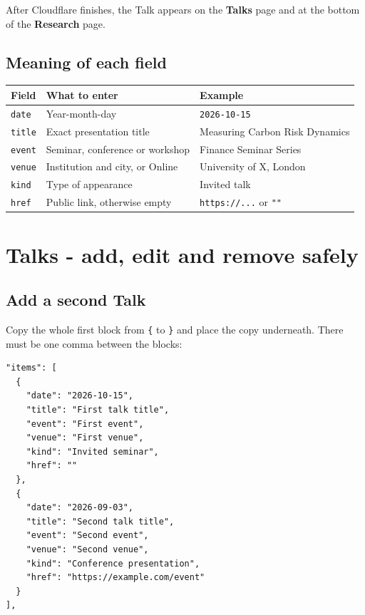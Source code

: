 \documentclass[10pt,a4paper]{article}
\begin{document}
\begin{tcolorbox}[teal]
After Cloudflare finishes, the Talk appears on the \textbf{Talks} page and at the bottom of the \textbf{Research} page.
\end{tcolorbox}

\subsection{Meaning of each field}

\begin{tabularx}{\linewidth}{L{25mm}Y L{43mm}}
\toprule
\textbf{Field} & \textbf{What to enter} & \textbf{Example}\\
\midrule
\texttt{date} & Year-month-day & \texttt{2026-10-15}\\
\texttt{title} & Exact presentation title & Measuring Carbon Risk Dynamics\\
\texttt{event} & Seminar, conference or workshop & Finance Seminar Series\\
\texttt{venue} & Institution and city, or Online & University of X, London\\
\texttt{kind} & Type of appearance & Invited talk\\
\texttt{href} & Public link, otherwise empty & \texttt{https://...} or \texttt{""}\\
\bottomrule
\end{tabularx}

\clearpage
\section{Talks - add, edit and remove safely}

\subsection{Add a second Talk}

Copy the whole first block from \texttt{\{} to \texttt{\}} and place the copy underneath. There must be one comma between the blocks:

\begin{lstlisting}
"items": [
  {
    "date": "2026-10-15",
    "title": "First talk title",
    "event": "First event",
    "venue": "First venue",
    "kind": "Invited seminar",
    "href": ""
  },
  {
    "date": "2026-09-03",
    "title": "Second talk title",
    "event": "Second event",
    "venue": "Second venue",
    "kind": "Conference presentation",
    "href": "https://example.com/event"
  }
],
\end{lstlisting}
\end{document}

